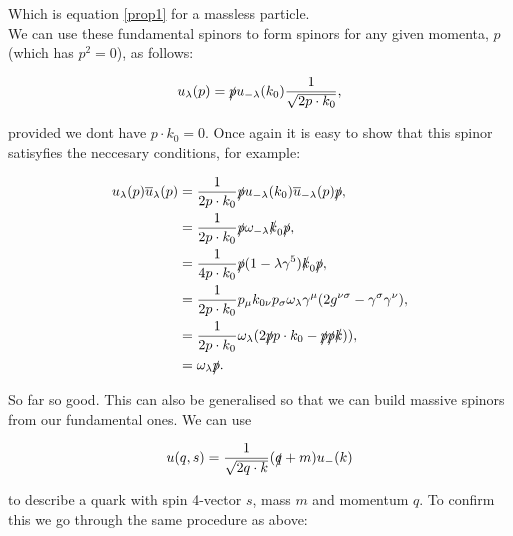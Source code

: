 	Which is equation \ref{prop1} for a massless particle.\\We can use these fundamental spinors to form spinors for any given momenta, $p$ (which has $p^2=0$), as follows:

	\begin{equation}
		u_\lambda(p) = \slashed p u_{-\lambda}(k_0) \frac{1}{\sqrt{2p\cdot k_0}},
	\end{equation}

	provided we dont have $p\cdot k_0=0$.  Once again it is easy to show that this spinor satisyfies the neccesary conditions, for example:

	\begin{subequations}
	\begin{align*}
		u_\lambda(p)\overline{u}_\lambda(p) &= \frac{1}{2p\cdot k_0}\slashed p u_{-\lambda}(k_0)\overline{u}_{-\lambda}(p)\slashed p,\\
		                                    &= \frac{1}{2p\cdot k_0}\slashed p \omega_{-\lambda}\slashed k_0\slashed p,\\
		                                    &= \frac{1}{4p\cdot k_0}\slashed p (1-\lambda\gamma^{5})\slashed k_0\slashed p,\\
		                                    &= \frac{1}{2p\cdot k_0}p_{\mu}k_{0\nu}p_{\sigma}\omega_{\lambda}\gamma^{\mu}(2g^{\nu\sigma} - \gamma^{\sigma}\gamma^{\nu}),\\
		                                    &= \frac{1}{2p\cdot k_0}\omega_\lambda(2\slashed p p\cdot k_0 - \slashed p\slashed p\slashed k)),\\
		                                    &= \omega_\lambda\slashed p.\\
	\end{align*}
	\end{subequations}

	So far so good.  This can also be generalised so that we can build massive spinors from our fundamental ones.  We can use

	\begin{equation}
		\label{u_def}
		u(q, s) = \frac{1}{\sqrt{2q\cdot k}}(\slashed q + m)u_-(k)
	\end{equation}

	to describe a quark with spin 4-vector $s$, mass $m$ and momentum $q$.  To confirm this we go through the same procedure as above:

